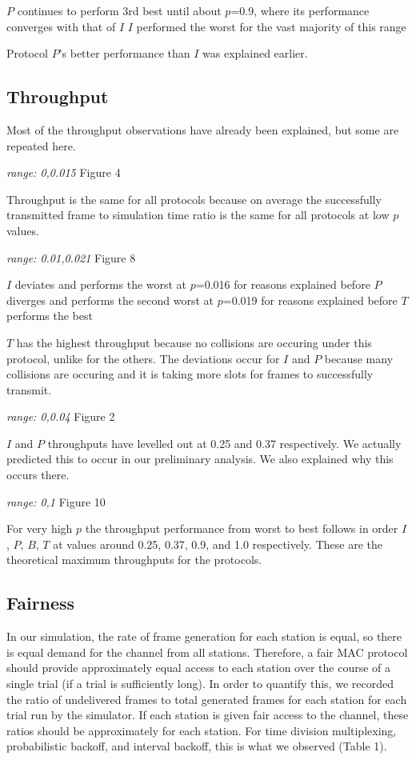 \documentclass[twocolumn]{article}
\begin{document}
$P$ continues to perform 3rd best until about $p$=0.9, where its performance converges with that of $I$
$I$ performed the worst for the vast majority of this range

Protocol $P$'s better performance than $I$ was explained earlier. 

\subsection*{Throughput} Most of the throughput observations have already been explained, but some are repeated here.

\emph{range: 0,0.015} Figure 4

Throughput is the same for all protocols because on average the successfully transmitted frame to simulation time ratio is the same
for all protocols at low $p$ values. 

\emph{range: 0.01,0.021} Figure 8

$I$ deviates and performs the worst at $p$=0.016 for reasons explained before
$P$ diverges and performs the second worst at $p$=0.019 for reasons explained before
$T$ performs the best

$T$ has the highest throughput because no collisions are occuring under this protocol, unlike for the others.
The deviations occur for $I$ and $P$ because many collisions are occuring and it is taking more slots for frames
to successfully transmit.

\emph{range: 0,0.04} Figure 2

$I$ and $P$ throughputs have levelled out at 0.25 and 0.37 respectively. We actually predicted this to occur in our
preliminary analysis. We also explained why this occurs there.

\emph{range: 0,1} Figure 10

For very high $p$ the throughput performance from worst to best follows in order $I$, $P$, $B$, $T$ at values around
0.25, 0.37, 0.9, and 1.0 respectively. These are the theoretical maximum throughputs for the protocols.

\subsection*{Fairness} 

In our simulation, the rate of frame generation for each station is equal, so there is
equal demand for the channel from all stations. Therefore, a fair MAC protocol should provide
approximately equal access to each station over the course of a single trial (if a trial is
sufficiently long). In order to quantify this, we recorded the ratio of undelivered frames
to total generated frames for each station for each trial run by the simulator. If each station
is given fair access to the channel, these ratios should be approximately for each station. For
time division multiplexing, probabilistic backoff, and interval backoff, this is what we 
observed (Table 1).
\end{document}
